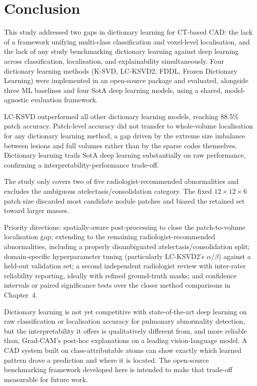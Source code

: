 \chapter{Conclusion}
\label{cha:conclusion}

This study addressed two gaps in dictionary learning for CT-based CAD: the lack of a framework unifying
multi-class classification and voxel-level localisation, and the lack of any study benchmarking dictionary
learning against deep learning across classification, localisation, and explainability simultaneously. Four
dictionary learning methods (K-SVD, LC-KSVD2, FDDL, Frozen Dictionary Learning) were implemented in an
open-source package and evaluated, alongside three ML baselines and four SotA deep learning models, using a
shared, model-agnostic evaluation framework.

LC-KSVD outperformed all other dictionary learning models, reaching 88.5\% patch accuracy. Patch-level accuracy did not
transfer to whole-volume localisation for any dictionary learning method, a gap
driven by the extreme size imbalance between lesions and full volumes rather than by the sparse codes
themselves. Dictionary learning trails SotA deep learning substantially on raw performance, confirming a
interpretability-performance trade-off.

The study only covers two of five radiologist-recommended abnormalities and excludes the ambiguous
atelectasis/consolidation category. The fixed $12\times12\times6$ patch size discarded most candidate nodule
patches and biased the retained set toward larger masses.

Priority directions: spatially-aware post-processing to close the patch-to-volume localisation gap; extending
to the remaining radiologist-recommended abnormalities, including a properly disambiguated
atelectasis/consolidation split; domain-specific hyperparameter tuning (particularly LC-KSVD2's $\alpha/\beta$)
against a held-out validation set; a second independent radiologist review with inter-rater reliability
reporting, ideally with refined ground-truth masks; and confidence intervals or paired significance tests over
the closer method comparisons in Chapter~4.

Dictionary learning is not yet competitive with state-of-the-art deep learning on raw classification or
localisation accuracy for pulmonary abnormality detection, but the interpretability it offers is qualitatively
different from, and more reliable than, Grad-CAM's post-hoc
explanations on a leading vision-language model. A CAD system built on class-attributable atoms can show
exactly which learned pattern drove a prediction and where it is located.
The open-source benchmarking framework developed here is intended to make
that trade-off measurable for future work.
